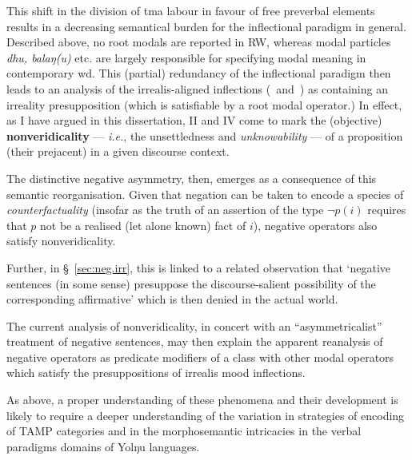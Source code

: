 This shift in the division of \acrshort{tma} labour in favour of free preverbal elements results in a decreasing semantical burden for the inflectional paradigm in general. Described above, no root modals are reported in \acrlong{RW}, whereas modal particles \textit{dhu, balaŋ(u)} etc. are largely responsible for specifying modal meaning in contemporary \gls{wd}. This (partial) redundancy of the inflectional paradigm then leads to an analysis of the irrealis-aligned inflections (\II~and~\IV) as containing an irreality presupposition (which is satisfiable by a root modal operator.) In effect, as I have argued in this dissertation, \gls{II} and \gls{IV} come to mark the (objective) \textbf{nonveridicality} --- \textit{i.e.}, the unsettledness and \textit{unknowability} --- of a proposition (their prejacent) in a given discourse context.

The distinctive negative asymmetry, then, emerges as a consequence of this semantic reorganisation. Given that negation can be taken to encode a species of \textit{counterfactuality} (insofar as the truth of an assertion of the type $ \neg p(i) $ requires that $ p $ not be a realised (let alone known) fact of $ i $), negative operators also satisfy nonveridicality. 

Further, in \S~\ref{sec:neg.irr}, this is linked to a related observation that `negative sentences (in some sense) presuppose the discourse-salient possibility of the corresponding affirmative' which is then denied in the actual world. 

The current analysis of nonveridicality, in concert with an  ``asymmetricalist'' treatment of negative sentences, may then explain the apparent reanalysis of negative operators as predicate modifiers of a class with other modal operators which satisfy the presuppositions of irrealis mood inflections.

 As above, a proper understanding of these phenomena and their development is likely to require a deeper understanding of the variation in strategies of encoding of TAMP categories and in the morphosemantic intricacies in the verbal paradigms domains of Yolŋu languages.

